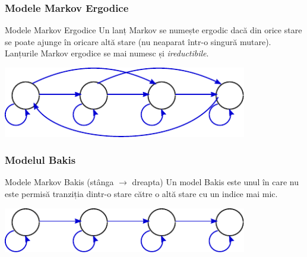 \begin{frame}
  \frametitle{Modele Markov Ergodice}
  \begin{block}{Modele Markov Ergodice}
    Un lanț Markov se numește \alert{ergodic} dacă din orice stare se poate ajunge în oricare altă stare (nu neaparat într-o singură mutare).\\
    Lanțurile Markov ergodice se mai numesc și \emph{ireductibile}.
  \end{block}
  \vspace*{1em}
  \begin{center}
    \includegraphics[width=0.8\textwidth]{graphics/other-hmm/ergodic.pdf}
  \end{center}
\end{frame}

\begin{frame}
  \frametitle{Modelul Bakis}
  \begin{block}{Modele Markov Bakis (stânga $\longrightarrow$ dreapta)}
    Un model \alert{Bakis} este unul în care nu este permisă tranziția
    dintr-o stare către o altă stare cu un indice mai mic.
  \end{block}
  \vspace*{1em}
  \begin{center}
    \includegraphics[width=0.8\textwidth]{graphics/other-hmm/left-to-right.pdf}
  \end{center}
\end{frame}